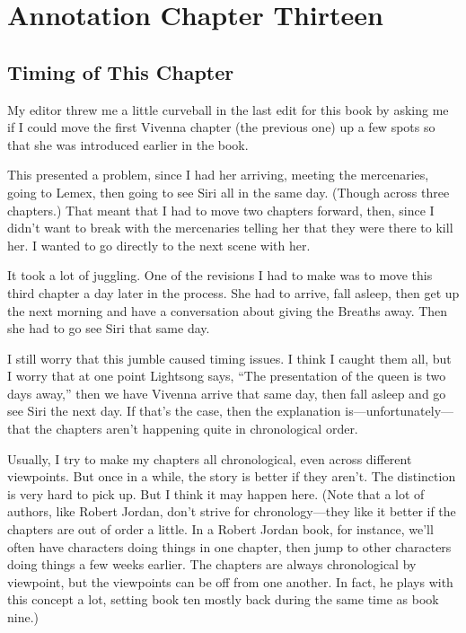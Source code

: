\section{Annotation Chapter Thirteen}

\subsection*{Timing of This Chapter}

My editor threw me a little curveball in the last edit for this book by asking me if I could move the first Vivenna chapter (the previous one) up a few spots so that she was introduced earlier in the book.

This presented a problem, since I had her arriving, meeting the mercenaries, going to Lemex, then going to see Siri all in the same day. (Though across three chapters.) That meant that I had to move two chapters forward, then, since I didn’t want to break with the mercenaries telling her that they were there to kill her. I wanted to go directly to the next scene with her.

It took a lot of juggling. One of the revisions I had to make was to move this third chapter a day later in the process. She had to arrive, fall asleep, then get up the next morning and have a conversation about giving the Breaths away. Then she had to go see Siri that same day.

I still worry that this jumble caused timing issues. I think I caught them all, but I worry that at one point Lightsong says, “The presentation of the queen is two days away,” then we have Vivenna arrive that same day, then fall asleep and go see Siri the next day. If that’s the case, then the explanation is—unfortunately—that the chapters aren’t happening quite in chronological order.

Usually, I try to make my chapters all chronological, even across different viewpoints. But once in a while, the story is better if they aren’t. The distinction is very hard to pick up. But I think it may happen here. (Note that a lot of authors, like Robert Jordan, don’t strive for chronology—they like it better if the chapters are out of order a little. In a Robert Jordan book, for instance, we’ll often have characters doing things in one chapter, then jump to other characters doing things a few weeks earlier. The chapters are always chronological by viewpoint, but the viewpoints can be off from one another. In fact, he plays with this concept a lot, setting book ten mostly back during the same time as book nine.)

